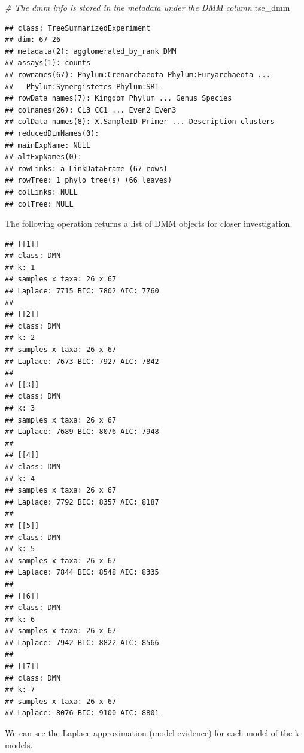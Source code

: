 \documentclass[
]{book}
\newenvironment{Shaded}{\begin{snugshade}}{\end{snugshade}}
\newcommand{\CommentTok}[1]{\textcolor[rgb]{0.56,0.35,0.01}{\textit{#1}}}
\newcommand{\FunctionTok}[1]{\textcolor[rgb]{0.00,0.00,0.00}{#1}}
\newcommand{\NormalTok}[1]{#1}
\newcommand{\SpecialCharTok}[1]{\textcolor[rgb]{0.00,0.00,0.00}{#1}}
\begin{document}
\begin{Shaded}
\begin{Highlighting}[]
\CommentTok{\# The dmm info is stored in the metadata under the \textquotesingle{}DMM\textquotesingle{} column}
\NormalTok{tse\_dmm}
\end{Highlighting}
\end{Shaded}

\begin{verbatim}
## class: TreeSummarizedExperiment 
## dim: 67 26 
## metadata(2): agglomerated_by_rank DMM
## assays(1): counts
## rownames(67): Phylum:Crenarchaeota Phylum:Euryarchaeota ...
##   Phylum:Synergistetes Phylum:SR1
## rowData names(7): Kingdom Phylum ... Genus Species
## colnames(26): CL3 CC1 ... Even2 Even3
## colData names(8): X.SampleID Primer ... Description clusters
## reducedDimNames(0):
## mainExpName: NULL
## altExpNames(0):
## rowLinks: a LinkDataFrame (67 rows)
## rowTree: 1 phylo tree(s) (66 leaves)
## colLinks: NULL
## colTree: NULL
\end{verbatim}

The following operation returns a list of DMM objects for closer investigation.

\begin{Shaded}
\end{Shaded}

\begin{verbatim}
## [[1]]
## class: DMN 
## k: 1 
## samples x taxa: 26 x 67 
## Laplace: 7715 BIC: 7802 AIC: 7760 
## 
## [[2]]
## class: DMN 
## k: 2 
## samples x taxa: 26 x 67 
## Laplace: 7673 BIC: 7927 AIC: 7842 
## 
## [[3]]
## class: DMN 
## k: 3 
## samples x taxa: 26 x 67 
## Laplace: 7689 BIC: 8076 AIC: 7948 
## 
## [[4]]
## class: DMN 
## k: 4 
## samples x taxa: 26 x 67 
## Laplace: 7792 BIC: 8357 AIC: 8187 
## 
## [[5]]
## class: DMN 
## k: 5 
## samples x taxa: 26 x 67 
## Laplace: 7844 BIC: 8548 AIC: 8335 
## 
## [[6]]
## class: DMN 
## k: 6 
## samples x taxa: 26 x 67 
## Laplace: 7942 BIC: 8822 AIC: 8566 
## 
## [[7]]
## class: DMN 
## k: 7 
## samples x taxa: 26 x 67 
## Laplace: 8076 BIC: 9100 AIC: 8801
\end{verbatim}

We can see the Laplace approximation (model evidence)
for each model of the k models.
\end{document}
